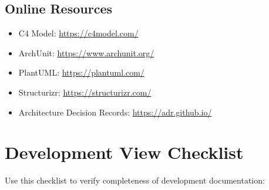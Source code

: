 \documentclass[11pt,letterpaper]{article}
\begin{document}
\subsection{Online Resources}

\begin{itemize}
    \item C4 Model: \url{https://c4model.com/}
    \item ArchUnit: \url{https://www.archunit.org/}
    \item PlantUML: \url{https://plantuml.com/}
    \item Structurizr: \url{https://structurizr.com/}
    \item Architecture Decision Records: \url{https://adr.github.io/}
\end{itemize}

\appendix

\section{Development View Checklist}

Use this checklist to verify completeness of development documentation:
\end{document}
